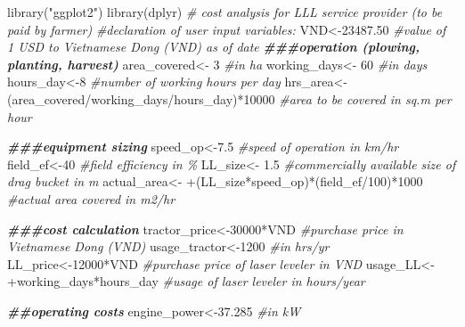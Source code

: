 \documentclass[
]{article}
\newenvironment{Shaded}{\begin{snugshade}}{\end{snugshade}}
\newcommand{\CommentTok}[1]{\textcolor[rgb]{0.56,0.35,0.01}{\textit{#1}}}
\newcommand{\DecValTok}[1]{\textcolor[rgb]{0.00,0.00,0.81}{#1}}
\newcommand{\DocumentationTok}[1]{\textcolor[rgb]{0.56,0.35,0.01}{\textbf{\textit{#1}}}}
\newcommand{\FloatTok}[1]{\textcolor[rgb]{0.00,0.00,0.81}{#1}}
\newcommand{\FunctionTok}[1]{\textcolor[rgb]{0.00,0.00,0.00}{#1}}
\newcommand{\NormalTok}[1]{#1}
\newcommand{\OtherTok}[1]{\textcolor[rgb]{0.56,0.35,0.01}{#1}}
\newcommand{\SpecialCharTok}[1]{\textcolor[rgb]{0.00,0.00,0.00}{#1}}
\newcommand{\StringTok}[1]{\textcolor[rgb]{0.31,0.60,0.02}{#1}}
\begin{document}
\begin{Shaded}
\begin{Highlighting}[]
\FunctionTok{library}\NormalTok{(}\StringTok{"ggplot2"}\NormalTok{)}
\FunctionTok{library}\NormalTok{(dplyr)}
\CommentTok{\# cost analysis for LLL service provider (to be paid by farmer)}
\CommentTok{\#declaration of user input variables:}
\NormalTok{VND}\OtherTok{\textless{}{-}}\FloatTok{23487.50} \CommentTok{\#value of 1 USD to Vietnamese Dong (VND) as of date}
\DocumentationTok{\#\#\#operation (plowing, planting, harvest)}
\NormalTok{area\_covered}\OtherTok{\textless{}{-}} \DecValTok{3} \CommentTok{\#in ha}
\NormalTok{working\_days}\OtherTok{\textless{}{-}} \DecValTok{60} \CommentTok{\#in days}
\NormalTok{hours\_day}\OtherTok{\textless{}{-}}\DecValTok{8} \CommentTok{\#number of working hours per day}
\NormalTok{hrs\_area}\OtherTok{\textless{}{-}}\NormalTok{(area\_covered}\SpecialCharTok{/}\NormalTok{working\_days}\SpecialCharTok{/}\NormalTok{hours\_day)}\SpecialCharTok{*}\DecValTok{10000} \CommentTok{\#area to be covered in sq.m per hour}

\DocumentationTok{\#\#\#equipment sizing}
\NormalTok{speed\_op}\OtherTok{\textless{}{-}}\FloatTok{7.5} \CommentTok{\#speed of operation in km/hr}
\NormalTok{field\_ef}\OtherTok{\textless{}{-}}\DecValTok{40} \CommentTok{\#field efficiency in \%}
\NormalTok{LL\_size}\OtherTok{\textless{}{-}} \FloatTok{1.5} \CommentTok{\#commercially available size of drag bucket in m}
\NormalTok{actual\_area}\OtherTok{\textless{}{-}} \SpecialCharTok{+}\NormalTok{(LL\_size}\SpecialCharTok{*}\NormalTok{speed\_op)}\SpecialCharTok{*}\NormalTok{(field\_ef}\SpecialCharTok{/}\DecValTok{100}\NormalTok{)}\SpecialCharTok{*}\DecValTok{1000} \CommentTok{\#actual area covered in m2/hr}

\DocumentationTok{\#\#\#cost calculation}
\NormalTok{tractor\_price}\OtherTok{\textless{}{-}}\DecValTok{30000}\SpecialCharTok{*}\NormalTok{VND }\CommentTok{\#purchase price in Vietnamese Dong (VND)}
\NormalTok{usage\_tractor}\OtherTok{\textless{}{-}}\DecValTok{1200} \CommentTok{\#in hrs/yr}
\NormalTok{LL\_price}\OtherTok{\textless{}{-}}\DecValTok{12000}\SpecialCharTok{*}\NormalTok{VND }\CommentTok{\#purchase price of laser leveler in VND}
\NormalTok{usage\_LL}\OtherTok{\textless{}{-}} \SpecialCharTok{+}\NormalTok{working\_days}\SpecialCharTok{*}\NormalTok{hours\_day }\CommentTok{\#usage of laser leveler in hours/year}

\DocumentationTok{\#\#operating costs}
\NormalTok{engine\_power}\OtherTok{\textless{}{-}}\FloatTok{37.285} \CommentTok{\#in kW}


\end{Highlighting}
\end{Shaded}
\end{document}
